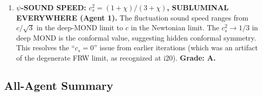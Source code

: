 \documentclass[11pt,a4paper]{article}
\begin{document}
\begin{enumerate}
\item \textbf{$\psi$-SOUND SPEED: $c_s^2 = (1+\chi)/(3+\chi)$, SUBLUMINAL EVERYWHERE (Agent 1).} The fluctuation sound speed ranges from $c/\sqrt{3}$ in the deep-MOND limit to $c$ in the Newtonian limit. The $c_s^2 \to 1/3$ in deep MOND is the conformal value, suggesting hidden conformal symmetry. This resolves the ``$c_s = 0$'' issue from earlier iterations (which was an artifact of the degenerate FRW limit, as recognized at i20). \textbf{Grade: A.}

\end{enumerate}

\subsection{All-Agent Summary}
\label{sec:all-agent}
\end{document}
